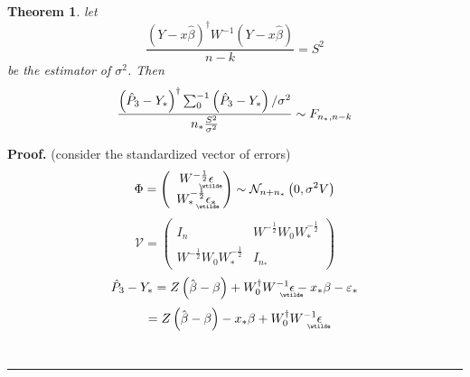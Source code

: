 \documentclass{article}
\newtheorem{theorem}{Theorem}
\newenvironment{proof}[1][Proof]{\noindent\textbf{#1.} }{\ \rule{0.5em}{0.5em}}
\begin{document}
\bigskip

\begin{theorem}
let 
\begin{equation*}
\frac{\left( Y-x\hat{\beta}\right) ^{\dagger }W^{-1}\left( Y-x\hat{\beta}%
\right) }{n-k}=S^{2}
\end{equation*}%
be the estimator of $\sigma ^{2}$. Then 
\begin{equation*}
\frac{\left( \hat{P}_{3}-Y_{\ast }\right) ^{\dagger
}\tsum\nolimits_{0}^{-1}\left( \hat{P}_{3}-Y_{\ast }\right) /\sigma ^{2}}{%
n_{\ast }\frac{S^{2}}{\sigma ^{2}}}\sim F_{n_{\ast },n-k}
\end{equation*}
\end{theorem}

\begin{proof}
(consider the standardized vector of errors)%
\begin{equation*}
\Phi =\left( 
\begin{array}{c}
W^{-\frac{1}{2}}%
\underaccent{\wtilde}{\epsilon}
\\ 
W_{\ast }^{-\frac{1}{2}}%
\underaccent{\wtilde}{\epsilon}%
_{\ast }%
\end{array}%
\right) \sim \mathcal{N}_{n+n_{\ast }}\left( 0,\sigma ^{2}V\right) 
\end{equation*}%
\begin{equation*}
\mathcal{V=}\left( 
\begin{array}{cc}
I_{n} & W^{-\frac{1}{2}}W_{0}W_{\ast }^{-\frac{1}{2}} \\ 
W^{-\frac{1}{2}}W_{0}W_{\ast }^{-\frac{1}{2}} & I_{n_{\ast }}%
\end{array}%
\right) 
\end{equation*}%
\begin{equation*}
\hat{P}_{3}-Y_{\ast }=Z\left( \hat{\beta}-\beta \right) +W_{0}^{\dagger
}W^{-1}%
\underaccent{\wtilde}{\epsilon}%
-x_{\ast }\beta -\varepsilon _{\ast }
\end{equation*}%
\begin{equation*}
=Z\left( \hat{\beta}-\beta \right) -x_{\ast }\beta +W_{0}^{\dagger }W^{-1}%
\underaccent{\wtilde}{\epsilon}%

\end{equation*}
\end{proof}
\end{document}
